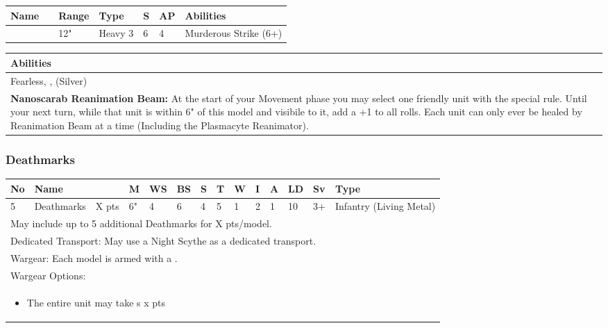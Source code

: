 \noindent
\begin{tabular}{||m{110pt} m{30pt} m{31pt} m{55pt} m{12pt} m{12pt} m{210pt}||}
	\hline
	Name & & Range & Type & S & AP & Abilities \\
	\hline
	\quickref{Atomiser Beam Lance} & & 12" & Heavy 3 & 6 & 4 & Murderous Strike (6+) \\
	\hline
\end{tabular}

\noindent
\begin{tabular}{||m{532pt}||}
	\hline
	Abilities \\
	\hline
	Fearless, \quickref{Reanimation Protocols}, \quickref{Soulless Hordes} (Silver) \\
	\textbf{Nanoscarab Reanimation Beam:} At the start of your Movement phase you may select one friendly unit with the \quickref{Reanimation Protocols} special rule. Until your next turn, while that unit is within 6" of this model and visibile to it, add a +1 to all \quickref{Reanimation Protocols} rolls. Each unit can only ever be healed by Reanimation Beam at a time (Including the Plasmacyte Reanimator). \\ 
	\hline
\end{tabular}




\newpage
\subsubsection{Deathmarks}

\noindent
\begin{tabular}{||m{10pt} m{90pt} m{30pt} m{11pt} m{11pt} m{11pt} m{11pt} m{11pt} m{11pt} m{11pt} m{11pt} m{11pt} m{11pt} m{135pt}||}
	\hline
	No & Name & & M & WS & BS & S & T & W & I & A & LD & Sv & Type \\
	\hline
	5 & Deathmarks & X pts & 6" & 4 & 6 & 4 & 5 & 1 & 2 & 1 & 10 & 3+ & Infantry (Living Metal) \\
	\hline
	\hline
	\multicolumn{14}{||Z{532 pt}||}{May include up to 5 additional Deathmarks for X pts/model.}\\	
	\multicolumn{14}{||Z{532 pt}||}{Dedicated Transport: May use a Night Scythe as a dedicated transport.}\\
	\hline
	\hline
	\multicolumn{14}{||Z{532 pt}||}{Wargear: Each model is armed with a \quickref{Synaptic Disnitegrator}.} \\
	\multicolumn{14}{||Z{532 pt}||}{Wargear Options:} \\	\multicolumn{14}{||Z{532 pt}||}{\begin{itemize}
			\item The entire unit may take \quickref{Hyper-Oubliette Navigator}s \hrulefill x pts
	\end{itemize}} \\
	\hline
\end{tabular}

